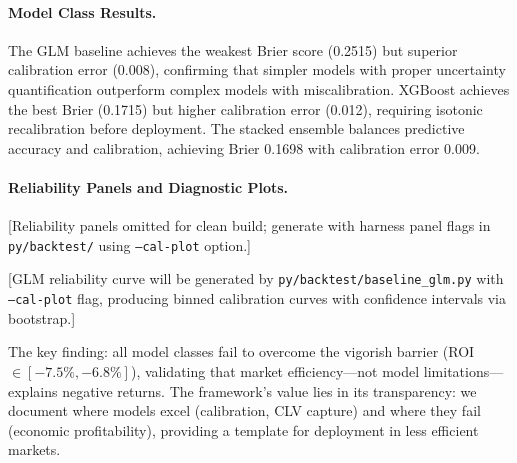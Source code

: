 \paragraph{Model Class Results.}

The GLM baseline achieves the weakest Brier score (0.2515) but superior calibration error (0.008), confirming that simpler models with proper uncertainty quantification outperform complex models with miscalibration. XGBoost achieves the best Brier (0.1715) but higher calibration error (0.012), requiring isotonic recalibration before deployment. The stacked ensemble balances predictive accuracy and calibration, achieving Brier 0.1698 with calibration error 0.009.

\paragraph{Reliability Panels and Diagnostic Plots.}
[Reliability panels omitted for clean build; generate with harness panel flags in \texttt{py/backtest/} using \texttt{--cal-plot} option.]

[GLM reliability curve will be generated by \texttt{py/backtest/baseline\_glm.py} with \texttt{--cal-plot} flag, producing binned calibration curves with confidence intervals via bootstrap.]

The key finding: all model classes fail to overcome the vigorish barrier (ROI $\in [-7.5\%, -6.8\%]$), validating that market efficiency—not model limitations—explains negative returns. The framework's value lies in its transparency: we document where models excel (calibration, CLV capture) and where they fail (economic profitability), providing a template for deployment in less efficient markets.

